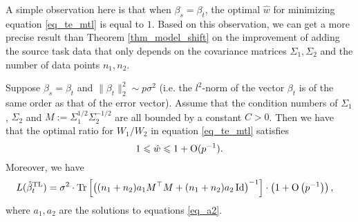A simple observation here is that when $\beta_s = \beta_t$, the optimal $\hat{w}$ for minimizing equation \eqref{eq_te_mtl} is equal to $1$.
Based on this observation, we can get a more precise result than Theorem \ref{thm_model_shift} on the improvement of adding the source task data that only depends on the covariance matrices $\Sigma_1, \Sigma_2$ and the number of data points $n_1, n_2$.



\begin{proposition}\label{thm_cov_shift}
Suppose $\beta_s = \beta_t$ and $\|\beta_t\|_2^2\sim p\sigma^2$ (i.e. the $l^2$-norm of the vector $\beta_t$ is of the same order as that of the error vector). Assume that the condition numbers of $\Sigma_1$, $\Sigma_2$ and $M:=\Sigma_1^{1/2}\Sigma_2^{-1/2}$ are all bounded by a constant $C>0$. Then we have that the optimal ratio for $W_1/W_2$ in equation \eqref{eq_te_mtl} satisfies
	$$1\leqslant \hat{w} \leqslant 1+\operatorname{O}(p^{-1}).$$%
Moreover, we have
	\begin{align}\label{tehatw1}
		L(\hat{\beta}^{\text{TL}}_{t}) &= \sigma^2 \cdot \operatorname{Tr}\left[\left({(n_1 + n_2)a_1 M^\top M  + (n_1 + n_2)a_2\operatorname{Id}}\right)^{-1}\right] \cdot \left(1+ \operatorname{O}\left(p^{-1}\right)\right),
	\end{align}
where $a_1, a_2$ are the solutions to equations \eqref{eq_a2}. %
\end{proposition}


